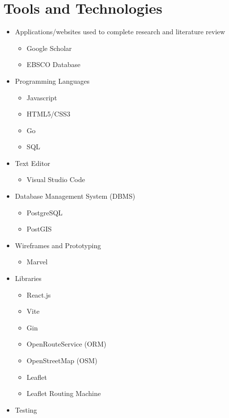 \chapter{Tools and Technologies}
\label{appendix:tools_and_technologies}

\begin{itemize}
  \item Applications/websites used to complete research and literature review
  \begin{itemize}
      \item Google Scholar
      \item EBSCO Database
  \end{itemize}
  \item Programming Languages
  \begin{itemize}
      \item Javascript
      \item HTML5/CSS3
      \item Go
      \item SQL
  \end{itemize}
  \item Text Editor
  \begin{itemize}
      \item Visual Studio Code
  \end{itemize}
  \item Database Management System (DBMS)
  \begin{itemize}
      \item PostgreSQL
      \item PostGIS
  \end{itemize}
  \item Wireframes and Prototyping
  \begin{itemize}
      \item Marvel
  \end{itemize}
  \item Libraries
  \begin{itemize}
      \item React.js
      \item Vite
      \item Gin
      \item OpenRouteService (ORM)
      \item OpenStreetMap (OSM)
      \item Leaflet
      \item Leaflet Routing Machine
  \end{itemize}
  \item Testing

\end{itemize}
